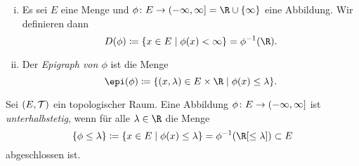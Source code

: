\pagebreak[2]
\begin{thDef}\hfill
    \begin{enumerate}[i)]
        \item
            Es sei $E$ eine Menge und $\phi\colon E\to \neginfinfoc
            = \R \cup \{\infty\}$ eine Abbildung. Wir definieren dann
            \[ D(\phi) \defeq \{ x\in E \Mid \phi(x) < \infty \} 
                = \phi^{-1}(\R)
            . \]
            
        \item
            Der \emph{Epigraph von $\phi$} ist die Menge
            \[ \epi(\phi) \defeq
                \{ (x,\lambda) \in E\times\R \Mid \phi(x) \leq \lambda \}
            . \]
    \end{enumerate}
\end{thDef}

\begin{thDef}
    Sei $(E,\operatorname{\mathcal{T}})$ ein topologischer Raum. Eine Abbildung $\phi\colon E\to
    (-\infty,\infty]$ ist \emph{unterhalbstetig}, wenn für alle $\lambda\in\R$
    die Menge
    \[ \{ \phi \leq \lambda \} \defeq \{ x\in E \Mid \phi(x) \leq \lambda \}
        = \phi^{-1}(\R[\leq\lambda]) \subset E
    \]
    abgeschlossen ist.
\end{thDef}

